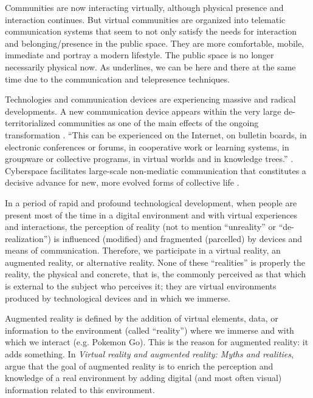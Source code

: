 \documentclass[english]{textolivre}
\begin{document}
Communities are now interacting virtually, although physical presence and interaction continues. But virtual communities are organized into telematic communication systems that seem to not only satisfy the needs for interaction and belonging/presence in the public space. They are more comfortable, mobile, immediate and portray a modern lifestyle. The public space is no longer necessarily physical now. As \textcite[p.~19]{levy_que_1999a} underlines, we can be here and there at the same time due to the communication and telepresence techniques.

Technologies and communication devices are experiencing massive and radical developments. A new communication device appears within the very large de-territorialized communities as one of the main effects of the ongoing transformation \cite[p.~90]{levy_que_1999a}. “This can be experienced on the Internet, on bulletin boards, in electronic conferences or forums, in cooperative work or learning systems, in groupware or collective programs, in virtual worlds and in knowledge trees.” \cite[p.~90]{levy_que_1999a}. Cyberspace facilitates large-scale non-mediatic communication that constitutes a decisive advance for new, more evolved forms of collective life \cite[p.~90]{levy_que_1999a}.

In a period of rapid and profound technological development, when people are present most of the time in a digital environment and with virtual experiences and interactions, the perception of reality (not to mention “unreality” or “de-realization”) is influenced (modified) and fragmented (parcelled) by devices and means of communication. Therefore, we participate in a virtual reality, an augmented reality, or alternative reality. None of these “realities” is properly the reality, the physical and concrete, that is, the commonly perceived as that which is external to the subject who perceives it; they are virtual environments produced by technological devices and in which we immerse.

Augmented reality is defined by the addition of virtual elements, data, or information to the environment (called “reality”) where we immerse and with which we interact (e.g. Pokemon Go). This is the reason for augmented reality: it adds something. In \textit{Virtual reality and augmented reality: Myths and realities}, \textcite[p.~xxvi]{arnaldi_virtual_2018} argue that the goal of augmented reality is to enrich the perception and knowledge of a real environment by adding digital (and most often visual) information related to this environment.
\end{document}
